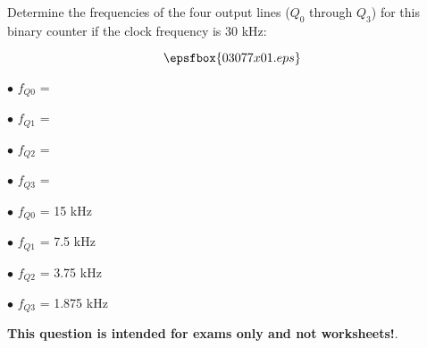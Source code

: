 

Determine the frequencies of the four output lines ($Q_0$ through $Q_3$) for this binary counter if the clock frequency is 30 kHz:

$$\epsfbox{03077x01.eps}$$

\medskip
\item{$\bullet$} $f_{Q0}$ =
\item{$\bullet$} $f_{Q1}$ =
\item{$\bullet$} $f_{Q2}$ =
\item{$\bullet$} $f_{Q3}$ =
\medskip







\medskip
\item{$\bullet$} $f_{Q0}$ = 15 kHz
\item{$\bullet$} $f_{Q1}$ = 7.5 kHz
\item{$\bullet$} $f_{Q2}$ = 3.75 kHz
\item{$\bullet$} $f_{Q3}$ = 1.875 kHz
\medskip







{\bf This question is intended for exams only and not worksheets!}.




